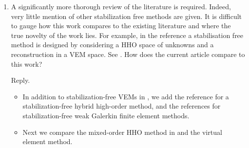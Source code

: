 \documentclass[10pt]{amsart}
\theoremstyle{definition}
\theoremstyle{remark}
\begin{document}
\begin{enumerate}[1.]
\item \textsf{A significantly more thorough review of the literature is required. Indeed, very little mention of other stabilization free methods are given. It is difficult to gauge how this work compares to the existing literature and where the true novelty of the work lies. For example, in the reference \cite{CicuttinErnLemaire2019} a stabilisation free method is designed by considering a HHO space of unknowns and a reconstruction in a VEM space. See \cite[Remark 5.1]{CicuttinErnLemaire2019}. How does the current article compare to this work?}

\smallskip \noindent \textcolor[rgb]{1.00,0.00,0.00}{Reply.}
\begin{itemize}
    \item In addition to stabilization-free VEMs in \cite{BerroneBorioMarcon2021,BerroneBorioMarcon2022,DAltriMirandaPatrunoSacco2021,ChenSukumar2022,ChenSukumar2023,MengWangBuMei2022}, we add the reference \cite{CicuttinErnLemaire2019} for a stabilization-free hybrid high-order method, and the references
\cite{YeZhang2020,AlTaweelWang2020,AlTaweelWang2020a,YeZhang2021,YeZhang2021a,AlTaweelWangYeZhang2021} for stabilization-free weak Galerkin finite element methods.
    \item Next we compare the mixed-order HHO method in \cite{CicuttinErnLemaire2019} and the virtual element method. 


\end{itemize}
\end{enumerate}
\end{document}
